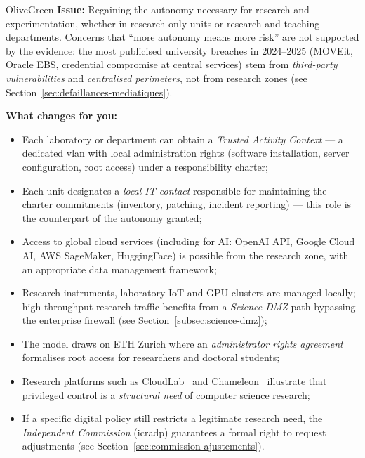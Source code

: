 \begin{stakeholderbox}{OliveGreen}
\textbf{Issue:} Regaining the autonomy necessary for research and
experimentation, whether in research-only units or research-and-teaching
departments. Concerns that ``more autonomy means more risk'' are
not supported by the evidence: the most publicised university breaches
in 2024--2025 (MOVEit, Oracle EBS, credential compromise at central
services) stem from \emph{third-party vulnerabilities} and
\emph{centralised perimeters}, not from research zones (see
Section~\ref{sec:defaillances-mediatiques}).

\medskip
\textbf{What changes for you:}
\begin{itemize}[nosep]
    \item Each laboratory or department can obtain a
    \emph{Trusted Activity Context} --- a dedicated \gls{vlan} with local
    administration rights (software installation, server configuration,
    root access) under a responsibility charter;
    \item Each unit designates a \emph{local IT contact}
    responsible for maintaining the charter commitments
    (inventory, patching, incident reporting) --- this role
    is the counterpart of the autonomy granted;
    \item Access to global cloud services (including for AI:
    OpenAI API, Google Cloud AI, AWS SageMaker, HuggingFace) is possible
    from the research zone, with an appropriate data management framework;
    \item Research instruments, laboratory IoT and GPU clusters
    are managed locally; high-throughput research traffic benefits
    from a \emph{Science DMZ} path bypassing the enterprise
    firewall (see Section~\ref{subsec:science-dmz});
    \item The model draws on ETH Zurich where an \emph{administrator rights
    agreement}~\cite{eth-admin-agreement} formalises root access
    for researchers and doctoral students;
    \item Research platforms such as CloudLab~\cite{cloudlab}
    and Chameleon~\cite{chameleon} illustrate that privileged
    control is a \emph{structural need} of computer science
    research;
    \item If a specific digital policy still restricts a
    legitimate research need, the \emph{Independent Commission}
    (\gls{icradp}) guarantees a formal right to request
    adjustments (see Section~\ref{sec:commission-ajustements}).
\end{itemize}
\end{stakeholderbox}

